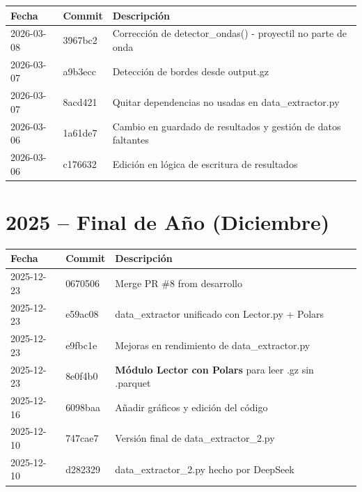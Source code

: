\documentclass[12pt,a4paper]{article}
\begin{document}
\begin{longtable}{@{}llp{10cm}@{}}
	\toprule
	\textbf{Fecha} & \textbf{Commit} & \textbf{Descripción}                                          \\
	\midrule
	2026-03-08     & 3967bc2         & Corrección de detector\_ondas() - proyectil no parte de onda  \\
	2026-03-07     & a9b3ecc         & Detección de bordes desde output.gz                           \\
	2026-03-07     & 8acd421         & Quitar dependencias no usadas en data\_extractor.py           \\
	2026-03-06     & 1a61de7         & Cambio en guardado de resultados y gestión de datos faltantes \\
	2026-03-06     & c176632         & Edición en lógica de escritura de resultados                  \\
	\bottomrule
\end{longtable}

\section*{2025 -- Final de Año (Diciembre)}

\begin{longtable}{@{}llp{10cm}@{}}
	\toprule
	\textbf{Fecha} & \textbf{Commit} & \textbf{Descripción}                                         \\
	\midrule
	2025-12-23     & 0670506         & Merge PR \#8 from desarrollo                                 \\
	2025-12-23     & e59ac08         & data\_extractor unificado con Lector.py + Polars             \\
	2025-12-23     & e9fbc1e         & Mejoras en rendimiento de data\_extractor.py                 \\
	2025-12-23     & 8e0f4b0         & \textbf{Módulo Lector con Polars} para leer .gz sin .parquet \\
	2025-12-16     & 6098baa         & Añadir gráficos y edición del código                         \\
	2025-12-10     & 747cae7         & Versión final de data\_extractor\_2.py                       \\
	2025-12-10     & d282329         & data\_extractor\_2.py hecho por DeepSeek                     \\
	\bottomrule
\end{longtable}
\end{document}
